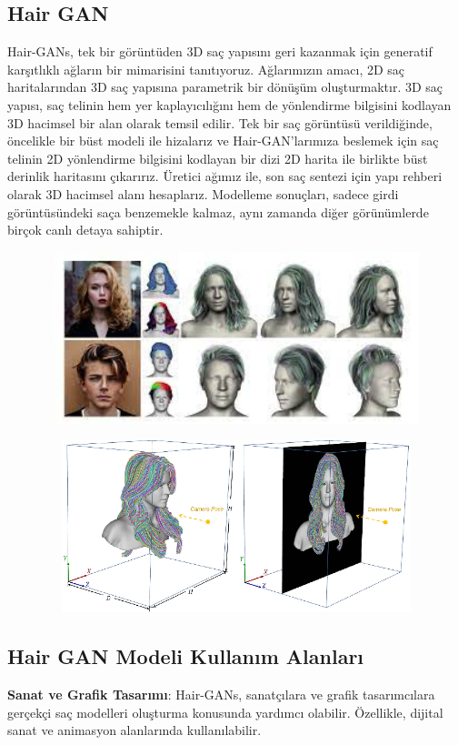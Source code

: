\documentclass[12pt]{article}
\begin{document}
\subsection{Hair GAN}
Hair-GANs, tek bir görüntüden 3D saç yapısını geri kazanmak için generatif karşıtlıklı ağların bir mimarisini tanıtıyoruz. Ağlarımızın amacı, 2D saç haritalarından 3D saç yapısına parametrik bir dönüşüm oluşturmaktır. 3D saç yapısı, saç telinin hem yer kaplayıcılığını hem de yönlendirme bilgisini kodlayan 3D hacimsel bir alan olarak temsil edilir. Tek bir saç görüntüsü verildiğinde, öncelikle bir büst modeli ile hizalarız ve Hair-GAN'larımıza beslemek için saç telinin 2D yönlendirme bilgisini kodlayan bir dizi 2D harita ile birlikte büst derinlik haritasını çıkarırız. Üretici ağımız ile, son saç sentezi için yapı rehberi olarak 3D hacimsel alanı hesaplarız. Modelleme sonuçları, sadece girdi görüntüsündeki saça benzemekle kalmaz, aynı zamanda diğer görünümlerde birçok canlı detaya sahiptir.
\begin{figure}[h]
    \centering
    \includegraphics[width=5\textwidth, height=5cm, keepaspectratio]{indir.jpeg}
    \label{fig:enter-label}
\end{figure}\cite{zhang2020hair}
\begin{figure}[h]
    \centering
    \includegraphics[width=5\textwidth, height=5cm, keepaspectratio]{ruya.png}
    \label{fig:enter-label}
\end{figure}

\subsection{Hair GAN Modeli Kullanım Alanları}
{\textbf{Sanat ve Grafik Tasarımı}}: Hair-GANs, sanatçılara ve grafik tasarımcılara gerçekçi saç modelleri oluşturma konusunda yardımcı olabilir. Özellikle, dijital sanat ve animasyon alanlarında kullanılabilir.
\end{document}
